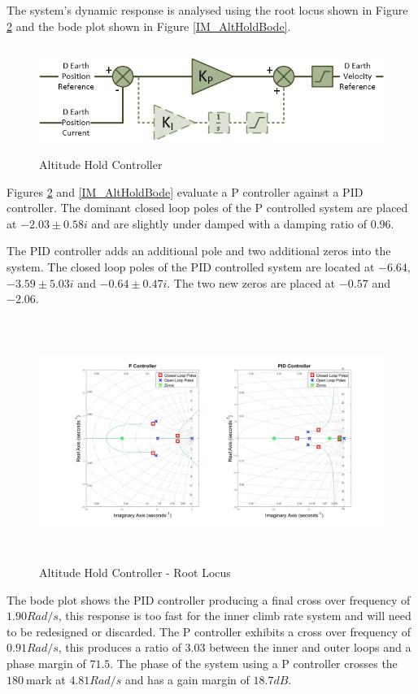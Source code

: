 	 The system's dynamic response is analysed using the root locus shown in Figure \ref{IM_AltHoldRoot} and the bode plot shown in Figure \ref{IM_AltHoldBode}.
	 
	 \begin{figure}[H]
	 	\centering
	 	\includegraphics[height = 3.5cm]{../References/Diagrams/AltHoldController.jpg}
	 	\caption{Altitude Hold Controller}
	 	\label{IM_AltHoldController}
	 \end{figure}
	 
	 Figures \ref{IM_AltHoldRoot} and \ref{IM_AltHoldBode} evaluate a P controller against a PID controller. The dominant closed loop poles of the P controlled system are placed at $-2.03 \pm 0.58i$ and are slightly under damped with a damping ratio of $0.96$. 

	 The PID controller adds an additional pole and two additional zeros into the system. The closed loop poles of the PID controlled system are located at $-6.64$, $-3.59 \pm 5.03i$ and $-0.64 \pm 0.47i$. The two new zeros are placed at $-0.57$ and $-2.06$.
	 
	 \begin{figure}[H]
	 	\centering
	 	\includegraphics[height = 7.9cm]{../Design/Matlab/Controllers/altitude_root.jpg}
	 	\caption{Altitude Hold Controller -  Root Locus}
	 	\label{IM_AltHoldRoot}
	 \end{figure}
	 
	 The bode plot shows the PID controller producing a final cross over frequency of $1.90Rad/s$, this response is too fast for the inner climb rate system and will need to be redesigned or discarded. The P controller exhibits a cross over frequency of $0.91Rad/s$, this produces a ratio of $3.03$ between the inner and outer loops and a phase margin of $71.5$\textdegree. The phase of the system using a P controller crosses the $180$\textdegree  $\ $mark at $4.81Rad/s$ and has a gain margin of $18.7dB$.
	 
